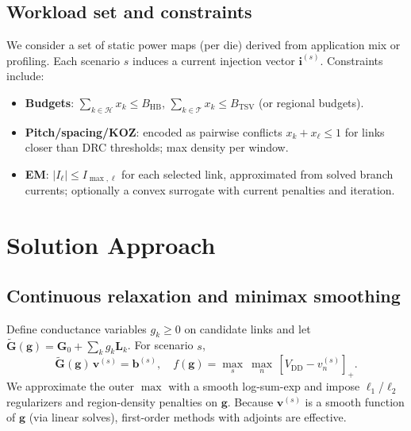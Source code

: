 \documentclass[conference]{IEEEtran}
\begin{document}
\subsection{Workload set and constraints}
We consider a set of static power maps (per die) derived from application mix or profiling. Each scenario $s$ induces a current injection vector $\bm{i}^{(s)}$. Constraints include:
\begin{itemize}[leftmargin=*,nosep]
  \item \textbf{Budgets}: $\sum_{k\in\mathcal{H}} x_k\le B_{\text{HB}}$, $\sum_{k\in\mathcal{T}} x_k\le B_{\text{TSV}}$ (or regional budgets).
  \item \textbf{Pitch/spacing/KOZ}: encoded as pairwise conflicts $x_k+x_\ell\le 1$ for links closer than DRC thresholds; max density per window.
  \item \textbf{EM}: $|I_\ell|\le I_{\max,\ell}$ for each selected link, approximated from solved branch currents; optionally a convex surrogate with current penalties and iteration.
\end{itemize}

\section{Solution Approach}
\subsection{Continuous relaxation and minimax smoothing}
Define conductance variables $g_k\ge 0$ on candidate links and let $\widetilde{\bm{G}}(\bm{g})=\bm{G}_0+\sum_k g_k \bm{L}_k$. For scenario $s$,
\begin{equation}
 \widetilde{\bm{G}}(\bm{g})\,\bm{v}^{(s)}=\bm{b}^{(s)},\quad
 f(\bm{g})=\max_{s}\ \max_{n}\,[V_{\text{DD}}-v^{(s)}_n]_+.
\end{equation}
We approximate the outer $\max$ with a smooth log-sum-exp and impose $\ell_1$/$\ell_2$ regularizers and region-density penalties on $\bm{g}$. Because $\bm{v}^{(s)}$ is a smooth function of $\bm{g}$ (via linear solves), first-order methods with adjoints are effective.
\end{document}

